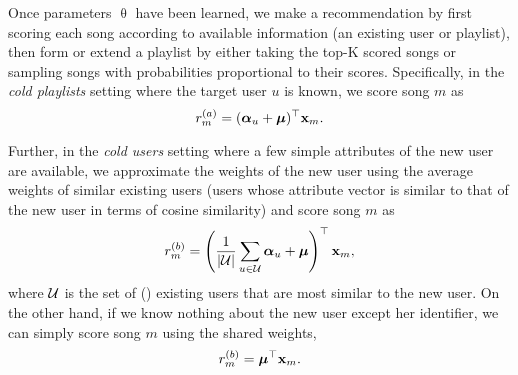 Once parameters $\uptheta$ have been learned, 
we make a recommendation by first scoring each song according to available information (\eg an existing user or playlist),
then form or extend a playlist by either taking the top-K scored songs or sampling songs with probabilities proportional to their scores.
%
Specifically, %
in the \emph{cold playlists} setting where the target user $u$ is known,
we score song $m$ as 
\begin{equation}
\label{eq:cp}
r_m^{(a)} = ({\bm{\alpha}}_u + \bm{\mu})^\top \mathbf{x}_m.
\end{equation}

Further, in the \emph{cold users} setting where a few simple attributes of the new user are available,
we approximate the weights of the new user using the average weights of similar existing users
(\eg users whose attribute vector is similar to that of the new user in terms of cosine similarity)
and score song $m$ as
\vspace{-1.5em}
\begin{equation}
\label{eq:cu}
r_m^{(b)} = \left( \frac{1}{|\mathcal{U}|} \sum_{u \in \mathcal{U}} {\bm{\alpha}}_u + \bm{\mu} \right)^\top \mathbf{x}_m,
\end{equation}
where $\mathcal{U}$ is the set of () existing users that are most similar to the new user.
On the other hand, if we know nothing about the new user except her identifier,
we can simply score song $m$ using the shared weights, \ie
\begin{equation}
\label{eq:cu2}
r_m^{(b)} = \bm{\mu}^\top \mathbf{x}_m.
\end{equation}


